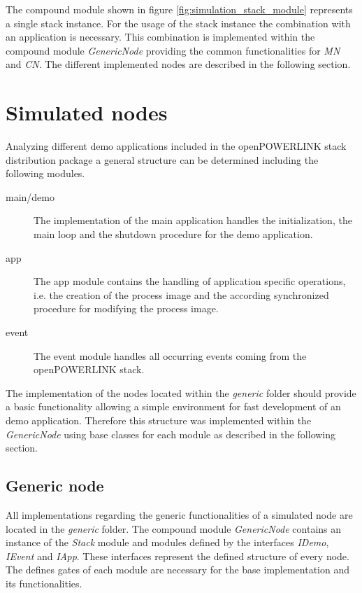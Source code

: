 The compound module shown in figure  \ref{fig:simulation_stack_module} represents a single stack instance.
For the usage of the stack instance the combination with an application is necessary.
This combination is implemented within the compound module \emph{GenericNode} providing the common functionalities for \emph{MN} and \emph{CN}.
The different implemented nodes are described in the following section.

\section{Simulated nodes}
\label{sec:porting_nodes}
Analyzing different demo applications included in the openPOWERLINK stack distribution package a general structure can be determined including the following modules.

\begin{description}
    \item[main/demo] The implementation of the main application handles the initialization, the main loop and the shutdown procedure for the demo application.
    \item[app] The app module contains the handling of application specific operations, i.e. the creation of the process image and the according synchronized procedure for modifying the process image.
    \item[event] The event module handles all occurring events coming from the openPOWERLINK stack.
\end{description}

The implementation of the nodes located within the \emph{generic} folder should provide a basic functionality allowing a simple environment for fast development of an demo application.
Therefore this structure was implemented within the \emph{GenericNode} using base classes for each module as described in the following section.

\subsection{Generic node}
\label{sec:porting_nodes_generic}
All implementations regarding the generic functionalities of a simulated node are located in the \emph{generic} folder.
The compound module \emph{GenericNode} contains an instance of the \emph{Stack} module and modules defined by the interfaces \emph{IDemo}, \emph{IEvent} and \emph{IApp}.
These interfaces represent the defined structure of every node.
The defines gates of each module are necessary for the base implementation and its functionalities.

